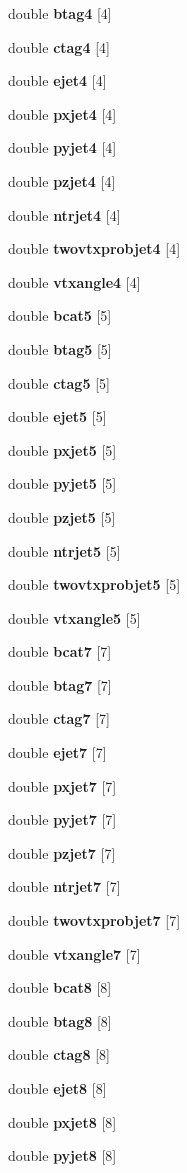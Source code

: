 \begin{DoxyCompactItemize}
double \textbf{ btag4} [4]
\item 
double \textbf{ ctag4} [4]
\item 
double \textbf{ ejet4} [4]
\item 
double \textbf{ pxjet4} [4]
\item 
double \textbf{ pyjet4} [4]
\item 
double \textbf{ pzjet4} [4]
\item 
double \textbf{ ntrjet4} [4]
\item 
double \textbf{ twovtxprobjet4} [4]
\item 
double \textbf{ vtxangle4} [4]
\item 
double \textbf{ bcat5} [5]
\item 
double \textbf{ btag5} [5]
\item 
double \textbf{ ctag5} [5]
\item 
double \textbf{ ejet5} [5]
\item 
double \textbf{ pxjet5} [5]
\item 
double \textbf{ pyjet5} [5]
\item 
double \textbf{ pzjet5} [5]
\item 
double \textbf{ ntrjet5} [5]
\item 
double \textbf{ twovtxprobjet5} [5]
\item 
double \textbf{ vtxangle5} [5]
\item 
double \textbf{ bcat7} [7]
\item 
double \textbf{ btag7} [7]
\item 
double \textbf{ ctag7} [7]
\item 
double \textbf{ ejet7} [7]
\item 
double \textbf{ pxjet7} [7]
\item 
double \textbf{ pyjet7} [7]
\item 
double \textbf{ pzjet7} [7]
\item 
double \textbf{ ntrjet7} [7]
\item 
double \textbf{ twovtxprobjet7} [7]
\item 
double \textbf{ vtxangle7} [7]
\item 
double \textbf{ bcat8} [8]
\item 
double \textbf{ btag8} [8]
\item 
double \textbf{ ctag8} [8]
\item 
double \textbf{ ejet8} [8]
\item 
double \textbf{ pxjet8} [8]
\item 
double \textbf{ pyjet8} [8]
\item 

\end{DoxyCompactItemize}
